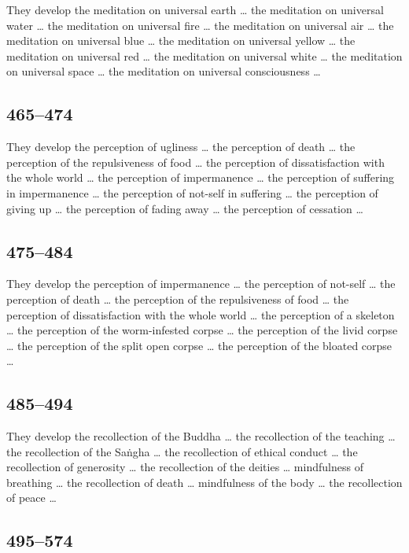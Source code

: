 \documentclass[12pt,openany]{book}%
\begin{document}
They develop the meditation on universal earth … the meditation on universal water … the meditation on universal fire … the meditation on universal air … the meditation on universal blue … the meditation on universal yellow … the meditation on universal red … the meditation on universal white … the meditation on universal space … the meditation on universal consciousness … 

\subsection*{465–474 }

They develop the perception of ugliness … the perception of death … the perception of the repulsiveness of food … the perception of dissatisfaction with the whole world … the perception of impermanence … the perception of suffering in impermanence … the perception of not-self in suffering … the perception of giving up … the perception of fading away … the perception of cessation … 

\subsection*{475–484 }

They develop the perception of impermanence … the perception of not-self … the perception of death … the perception of the repulsiveness of food … the perception of dissatisfaction with the whole world … the perception of a skeleton … the perception of the worm-infested corpse … the perception of the livid corpse … the perception of the split open corpse … the perception of the bloated corpse … 

\subsection*{485–494 }

They develop the recollection of the Buddha … the recollection of the teaching … the recollection of the \textsanskrit{Saṅgha} … the recollection of ethical conduct … the recollection of generosity … the recollection of the deities … mindfulness of breathing … the recollection of death … mindfulness of the body … the recollection of peace … 

\subsection*{495–574 }
\end{document}
